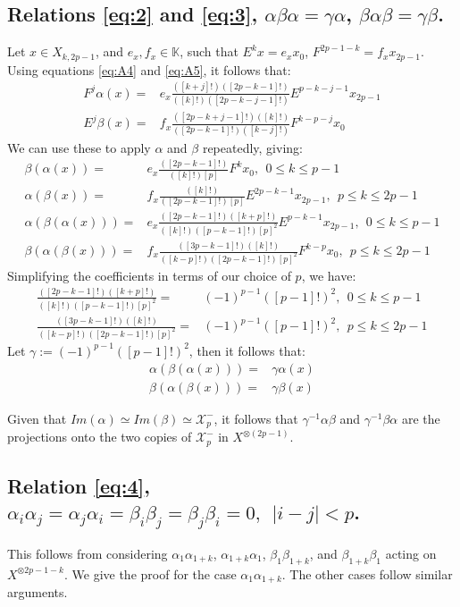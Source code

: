 \documentclass[]{article}
\begin{document}
\subsection{Relations \ref{eq:2} and \ref{eq:3}, $\alpha\beta\alpha=\gamma\alpha$, $\beta\alpha\beta=\gamma\beta$.\label{subsect 3}}
Let $x\in X_{k,2p-1}$, and $e_{x},f_{x}\in\mathbb{K}$, such that $E^{k}x=e_{x}x_{0}$, $F^{2p-1-k}=f_{x}x_{2p-1}$. Using equations \ref{eq:A4} and \ref{eq:A5}, it follows that:
\begin{align*}
F^{j}\alpha(x)=& e_{x}\frac{([k+j]!)([2p-k-1]!)}{([k]!)([2p-k-j-1]!)}E^{p-k-j-1}x_{2p-1}\\
E^{j}\beta(x)=& f_{x}\frac{([2p-k+j-1]!)([k]!)}{([2p-k-1]!)([k-j]!)}F^{k-p-j}x_{0}
\end{align*}
We can use these to apply $\alpha$ and $\beta$ repeatedly, giving:
\begin{align*}
\beta(\alpha(x))=& e_{x}\frac{([2p-k-1]!)}{([k]!)[p]}F^{k}x_{0}, \:\: 0\leq k\leq p-1\\
\alpha(\beta(x))=& f_{x}\frac{([k]!)}{([2p-k-1]!)[p]}E^{2p-k-1}x_{2p-1}, \:\: p\leq k\leq 2p-1\\
\alpha(\beta(\alpha(x)))=& e_{x}\frac{([2p-k-1]!)([k+p]!)}{([k]!)([p-k-1]!)[p]^{2}}E^{p-k-1}x_{2p-1}, \:\: 0\leq k\leq p-1\\
\beta(\alpha(\beta(x)))=& f_{x}\frac{([3p-k-1]!)([k]!)}{([k-p]!)([2p-k-1]!)[p]^{2}}F^{k-p}x_{0}, \:\: p\leq k\leq 2p-1
\end{align*}
Simplifying the coefficients in terms of our choice of $p$, we have:
\begin{align*}
\frac{([2p-k-1]!)([k+p]!)}{([k]!)([p-k-1]!)[p]^{2}}=&(-1)^{p-1}([p-1]!)^{2}, \:\: 0\leq k\leq p-1\\
\frac{([3p-k-1]!)([k]!)}{([k-p]!)([2p-k-1]!)[p]^{2}}=&(-1)^{p-1}([p-1]!)^{2}, \:\: p\leq k\leq 2p-1
\end{align*}
Let $\gamma:=(-1)^{p-1}([p-1]!)^2$, then it follows that:
\begin{align*}
\alpha(\beta(\alpha(x)))=&\gamma\alpha(x)\\
\beta(\alpha(\beta(x)))=&\gamma\beta(x)
\end{align*}

Given that $Im(\alpha)\simeq Im(\beta)\simeq \mathcal{X}^{-}_{p}$, it follows that $\gamma^{-1}\alpha\beta$ and $\gamma^{-1}\beta\alpha$ are the projections onto the two copies of $\mathcal{X}^{-}_{p}$ in $X^{\otimes (2p-1)}$.

\subsection{Relation \ref{eq:4}, $\alpha_{i}\alpha_{j}=\alpha_{j}\alpha_{i}=\beta_{i}\beta_{j}=\beta_{j}\beta_{i}=0, \:\: \lvert i-j\rvert< p$.\label{subsect 4}}
This follows from considering $\alpha_{1}\alpha_{1+k}$, $\alpha_{1+k}\alpha_{1}$, $\beta_{1}\beta_{1+k}$, and $\beta_{1+k}\beta_{1}$ acting on $X^{\otimes 2p-1-k}$. We give the proof for the case $\alpha_{1}\alpha_{1+k}$. The other cases follow similar arguments.\\
\end{document}
